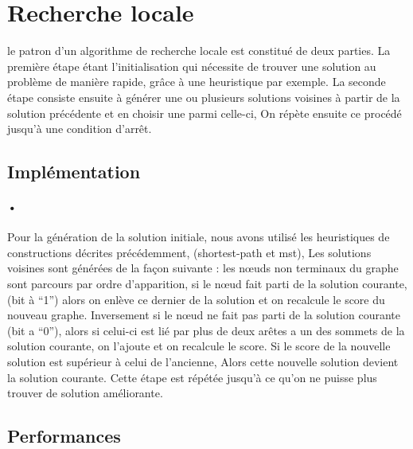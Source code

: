 \documentclass[10pt]{article}
\begin{document}
	
\section{Recherche locale}

le patron d'un algorithme de recherche locale est constitué de deux parties. La première étape étant  l'initialisation qui nécessite de trouver une solution au problème de manière rapide, grâce à une heuristique par exemple. La seconde étape consiste ensuite à générer une ou plusieurs solutions voisines à partir de la solution précédente et en choisir une parmi celle-ci, On répète ensuite ce procédé jusqu'à une condition d'arrêt.

\subsection{Implémentation}
\paragraph{•}
Pour la génération de la solution initiale, nous avons utilisé les heuristiques de constructions décrites précédemment, (shortest-path et mst), Les solutions voisines sont générées de la façon suivante : les nœuds non terminaux du graphe sont parcours par ordre d'apparition, si le nœud fait parti de la solution courante, (bit à “1”) alors on enlève ce dernier de la solution et on recalcule le score du nouveau graphe. Inversement si le nœud ne fait pas parti de la solution courante (bit a “0”), alors si celui-ci est lié par plus de deux arêtes a un des sommets de la solution courante, on l'ajoute et on recalcule le score.
    Si le score de la nouvelle solution est supérieur à celui de l'ancienne, Alors cette nouvelle solution devient la solution courante. Cette étape est répétée jusqu'à ce qu'on ne puisse plus trouver de solution améliorante.
\subsection{Performances}
\end{document}

